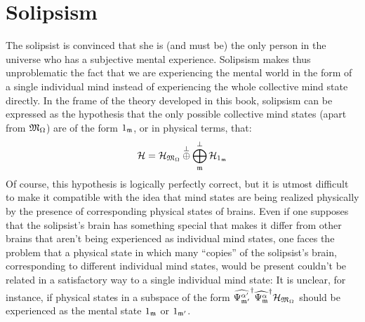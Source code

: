 \documentclass[10pt,a4paper,twoside,openany]{book}
\begin{document}
\section{Solipsism}

The solipsist is convinced that she is (and must be) the only person in the universe who has a subjective mental experience. Solipsism makes thus unproblematic the fact that we are experiencing the mental world in the form of a single individual mind instead of experiencing the whole collective mind state directly. In the frame of the theory developed in this book, solipsism can be expressed as the hypothesis that the only possible collective mind states (apart from $\mathfrak{M}_\Omega$) are of the form ${1}_{\mathfrak{m}}$, or in physical terms, that:
\begin{equation*}
\mathcal H = \mathcal H_{\mathfrak{M}_\Omega} \overset{\perp}{\oplus} \bigoplus_{\mathfrak{m}}^\perp \mathcal H_{{1}_{\mathfrak{m}}}
\end{equation*}
Of course, this hypothesis is logically perfectly correct, but it is utmost difficult to make it compatible with the idea that mind states are being realized physically by the presence of corresponding physical states of brains. Even if one supposes that the solipsist's brain has something special that makes it differ from other brains that aren't being experienced as individual mind states, one faces the problem that a physical state in which many ``copies'' of the solipsist's brain, corresponding to different individual mind states, would be present couldn't be related in a satisfactory way to a single individual mind state: It is unclear, for instance, if physical states in a subspace of the form $\widehat{\Psi_{\mathfrak{m}'}^{\alpha'}}^{\dagger} \widehat{\Psi_{\mathfrak{m}}^\alpha}^{\dagger} \mathcal H_{\mathfrak{M}_\Omega}$ should be experienced as the mental state ${1}_{\mathfrak{m}}$ or ${1}_{\mathfrak{m}'}$.




\end{document}
